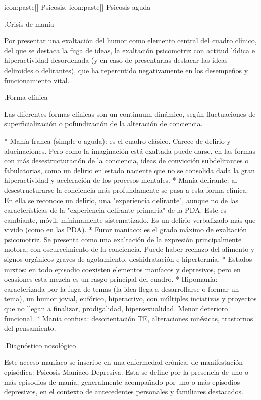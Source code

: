 \documentclass[encares.tex]{subfiles}
\begin{document}
icon:paste[] Psicosis.
icon:paste[] Psicosis aguda

.Crisis de manía

Por presentar una exaltación del humor como elemento central del cuadro clínico, del que se destaca la fuga de ideas, la exaltación psicomotriz con actitud lúdica e hiperactividad desordenada (y en caso de presentarlas destacar las ideas deliroides o delirantes), que ha repercutido negativamente en los desempeños y funcionamiento vital.

.Forma clínica

Las diferentes formas clínicas son un continuum dinámico, según fluctuaciones de superficialización o pofundización de la alteración de conciencia.

* Manía franca (simple o aguda): es el cuadro clásico. Carece de delirio y alucinaciones. Pero como la imaginación está exaltada puede darse, en las formas con más desestructuración de la conciencia, ideas de convicción subdelirantes o fabulatorias, como un delirio en estado naciente que no se consolida dada la gran hiperactividad y aceleración de los procesos mentales.
* Manía delirante: al desestructurarse la conciencia más profundamente se pasa a esta forma clínica. En ella se reconoce un delirio, una "experiencia delirante", aunque no de las características de la "experiencia delirante primaria" de la PDA. Este es cambiante, móvil, mínimamente sistematizado. Es un delirio verbalizado más que vivido (como en las PDA).
* Furor maníaco: es el grado máximo de exaltación psicomotriz. Se presenta como una exaltación de la expresión principalmente motora, con oscurecimiento de la conciencia. Puede haber rechazo del alimento y signos orgánicos graves de agotamiento, deshidratación e hipertermia.
* Estados mixtos: en todo episodio coexisten elementos maníacos y depresivos, pero en ocasiones esta mezcla es un rasgo principal del cuadro.
* Hipomanía: caracterizada por la fuga de temas (la idea llega a desarrollarse o formar un tema), un humor jovial, eufórico, hiperactivo, con múltiples inciativas y proyectos que no llegan a finalizar, prodigalidad, hipersexualidad. Menor deterioro funcional.
* Manía confusa: desorientación TE, alteraciones mnésicas, trastornos del pensamiento.

.Diagnóstico nosológico

Este acceso maníaco se inscribe en una enfermedad crónica, de manifestación episódica: Psicosis Maníaco-Depresiva. Esta se define por la presencia de uno o más episodios de manía, generalmente acompañado por uno o más episodios depresivos, en el contexto de antecedentes personales y familiares destacados.
\end{document}

